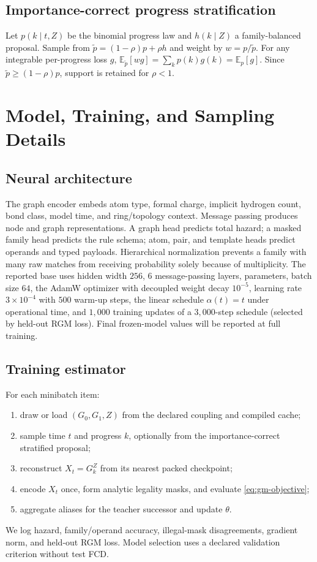 \documentclass{article}
\newcommand{\E}{\mathbb{E}}
\theoremstyle{definition}
\theoremstyle{remark}
\begin{document}
\subsection{Importance-correct progress stratification}

Let $p(k\mid t,Z)$ be the binomial progress law and $h(k\mid Z)$ a family-balanced proposal. Sample from $\widetilde p=(1-\rho)p+\rho h$ and weight by $w=p/\widetilde p$. For any integrable per-progress loss $g$, $\E_{\widetilde p}[wg]=\sum_kp(k)g(k)=\E_p[g]$. Since $\widetilde p\ge(1-\rho)p$, support is retained for $\rho<1$.

\section{Model, Training, and Sampling Details}\label{app:model}

\subsection{Neural architecture}

The graph encoder embeds atom type, formal charge, implicit hydrogen count, bond class, model time, and ring/topology context. Message passing produces node and graph representations. A graph head predicts total hazard; a masked family head predicts the rule schema; atom, pair, and template heads predict operands and typed payloads. Hierarchical normalization prevents a family with many raw matches from receiving probability solely because of multiplicity. The reported base uses hidden width $256$, $6$ message-passing layers, \ComposeParameters{} parameters, batch size $64$, the AdamW optimizer with decoupled weight decay $10^{-5}$, learning rate $3\times10^{-4}$ with $500$ warm-up steps, the linear schedule $\alpha(t)=t$ under operational time, and $1{,}000$ training updates of a $3{,}000$-step schedule (selected by held-out RGM loss). Final frozen-model values will be reported at full training.

\subsection{Training estimator}

For each minibatch item:
\begin{enumerate}[leftmargin=*]
    \item draw or load $(G_0,G_1,Z)$ from the declared coupling and compiled cache;
    \item sample time $t$ and progress $k$, optionally from the importance-correct stratified proposal;
    \item reconstruct $X_t=G_k^Z$ from its nearest packed checkpoint;
    \item encode $X_t$ once, form analytic legality masks, and evaluate \eqref{eq:gm-objective};
    \item aggregate aliases for the teacher successor and update $\theta$.
\end{enumerate}
We log hazard, family/operand accuracy, illegal-mask disagreements, gradient norm, and held-out RGM loss. Model selection uses a declared validation criterion without test FCD.
\end{document}
